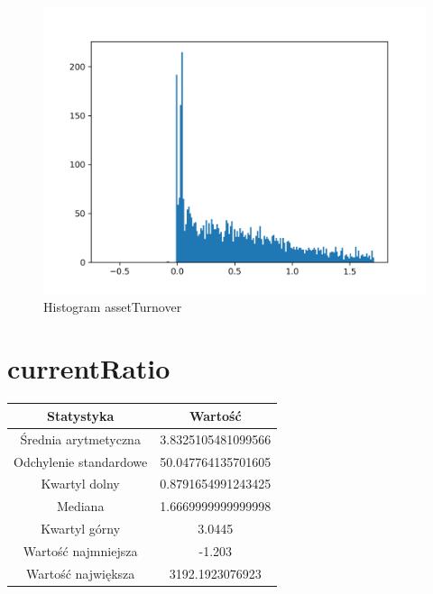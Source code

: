 \documentclass{article}
\begin{document}
\begin{figure}[h!]
    \includegraphics[width=\linewidth]{variables/assetTurnover.png}
    \caption{Histogram assetTurnover }
\end{figure}\section{ currentRatio }

\begin{center}
    \begin{tabular}{|c | c|} 
    \hline
    Statystyka & Wartość \\
    \hline\hline
    Średnia arytmetyczna & 3.8325105481099566 \\ 
    \hline
    Odchylenie standardowe & 50.047764135701605 \\
    \hline
    Kwartyl dolny & 0.8791654991243425 \\
    \hline
    Mediana & 1.6669999999999998 \\
    \hline
    Kwartyl górny & 3.0445 \\
    \hline
    Wartość najmniejsza & -1.203 \\
    \hline
    Wartość największa & 3192.1923076923 \\
    \hline
   \end{tabular}
\end{center}
\end{document}
